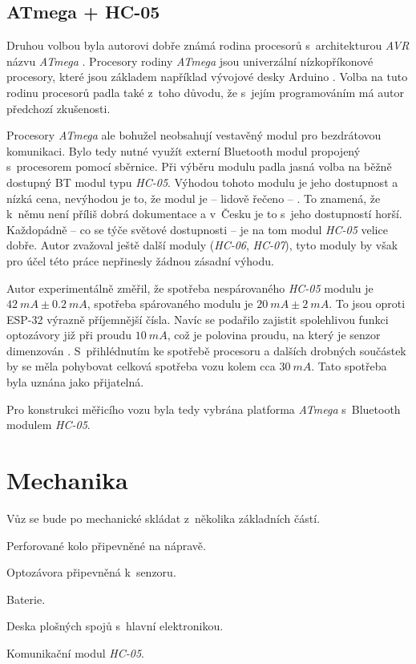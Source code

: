 \subsection{ATmega + HC-05}
\label{subsec:wsm-atmega}

Druhou volbou byla autorovi dobře známá rodina procesorů s~architekturou
\textit{AVR} názvu \textit{ATmega} \cite{avr}. Procesory rodiny \textit{ATmega}
jsou univerzální nízkopříkonové procesory, které jsou základem například
vývojové desky Arduino \cite{arduino}. Volba na tuto rodinu procesorů padla
také z~toho důvodu, že s~jejím programováním má autor předchozí zkušenosti.

Procesory \textit{ATmega} ale bohužel neobsahují vestavěný modul pro
bezdrátovou komunikaci.  Bylo tedy nutné využít externí Bluetooth modul
propojený s~procesorem pomocí sběrnice. Při výběru modulu padla jasná volba na
běžně dostupný BT modul typu \textit{HC-05}. Výhodou tohoto modulu je jeho
dostupnost a nízká cena, nevýhodou je to, že modul je -- lidově řečeno --
. To znamená, že k~němu není příliš dobrá dokumentace a v~Česku je
to s~jeho dostupností horší. Každopádně -- co se týče světové dostupnosti -- je
na tom modul \textit{HC-05} velice dobře. Autor zvažoval ještě další moduly
(\textit{HC-06}, \textit{HC-07}), tyto moduly by však pro účel této práce
nepřinesly žádnou zásadní výhodu.

Autor experimentálně změřil, že spotřeba nespárovaného \textit{HC-05} modulu je
$42\ mA \pm 0.2\ mA$, spotřeba spárovaného modulu je $20\ mA \pm 2\ mA$. To
jsou oproti ESP-32 výrazně příjemnější čísla. Navíc se podařilo zajistit
spolehlivou funkci optozávory již při proudu $10\ mA$, což je polovina proudu,
na který je senzor dimenzován \cite{gp1s23:datasheet}. S~přihlédnutím ke
spotřebě procesoru a dalších drobných součástek by se měla pohybovat celková
spotřeba vozu kolem cca $30\ mA$. Tato spotřeba byla uznána jako přijatelná.

Pro konstrukci měřicího vozu byla tedy vybrána platforma \textit{ATmega}
s~Bluetooth modulem \textit{HC-05}.

\section{Mechanika}
\label{sec:wsm-mech}

Vůz se bude po mechanické skládat z~několika základních částí.

\begin{compactenum}
\item Perforované kolo připevněné na nápravě.
\item Optozávora připevněná k~senzoru.
\item Baterie.
\item Deska plošných spojů s~hlavní elektronikou.
\item Komunikační modul \textit{HC-05}.
\end{compactenum}

